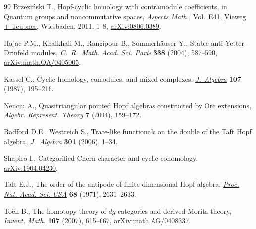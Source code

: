 \documentclass[11pt]{article}
\numberwithin{equation}{section}
\numberwithin{equation}{section}
\begin{document}
\begin{thebibliography}{99}
Brzezi\'nski T., Hopf-cyclic homology with contramodule coefficients, in
 Quantum groups and noncommutative spaces, \textit{Aspects Math.}, Vol.~E41,
 \href{https://doi.org/10.1007/978-3-8348-9831-9_1}{Vieweg + Teubner}, Wiesbaden, 2011, 1--8, \href{https://arxiv.org/abs/0806.0389}{arXiv:0806.0389}.

Hajac P.M., Khalkhali M., Rangipour B., Sommerh\"auser Y., Stable
 anti-{Y}etter--{D}rinfeld modules, \href{https://doi.org/10.1016/j.crma.2003.11.037}{\textit{C.~R.~Math. Acad. Sci. Paris}}
 \textbf{338} (2004), 587--590, \href{https://arxiv.org/abs/math.QA/0405005}{arXiv:math.QA/0405005}.

Kassel C., Cyclic homology, comodules, and mixed complexes, \href{https://doi.org/10.1016/0021-8693(87)90086-X}{\textit{J.~Algebra}}
 \textbf{107} (1987), 195--216.

Nenciu A., Quasitriangular pointed {H}opf algebras constructed by {O}re
 extensions, \href{https://doi.org/10.1023/B:ALGE.0000026785.03997.60}{\textit{Algebr. Represent. Theory}} \textbf{7} (2004), 159--172.

Radford D.E., Westreich S., Trace-like functionals on the double of the {T}aft
 {H}opf algebra, \href{https://doi.org/10.1016/j.jalgebra.2004.04.023}{\textit{J.~Algebra}} \textbf{301} (2006), 1--34.

Shapiro I., Categorified {C}hern character and cyclic cohomology,
 \href{https://arxiv.org/abs/1904.04230}{arXiv:1904.04230}.

Taft E.J., The order of the antipode of finite-dimensional {H}opf algebra,
 \href{https://doi.org/10.1073/pnas.68.11.2631}{\textit{Proc. Nat. Acad. Sci. USA}} \textbf{68} (1971), 2631--2633.

To\"en B., The homotopy theory of {$dg$}-categories and derived {M}orita
 theory, \href{https://doi.org/10.1007/s00222-006-0025-y}{\textit{Invent. Math.}} \textbf{167} (2007), 615--667,
 \href{https://arxiv.org/abs/math.AG/0408337}{arXiv:math.AG/0408337}.

\end{thebibliography}
\end{document}
